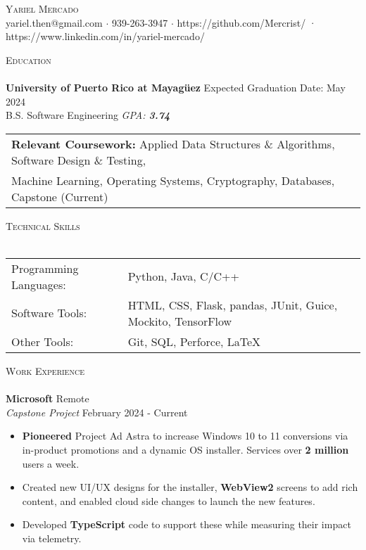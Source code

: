 \documentclass[a4paper]{article}
\newcommand{\lineunder} {
    \vspace*{-8pt} \\
    \hspace*{-18pt} \hrulefill \\
}
\newcommand{\header} [1] {
    {\hspace*{-18pt}\vspace*{6pt} \textsc{#1}}
    \vspace*{-6pt} \lineunder
}
\begin{document}
\vspace*{-40pt}

    

\vspace*{-10pt}
\begin{center}
	{\Huge \scshape {Yariel Mercado}}\\
	yariel.then@gmail.com $\cdot$ 939-263-3947 $\cdot$ https://github.com/Mercrist/ · https://www.linkedin.com/in/yariel-mercado/\\
\end{center}

\header{Education}
\textbf{University of Puerto Rico at Mayagüez} \hfill Expected Graduation Date: May 2024\\	
B.S. Software Engineering \textit{GPA: \bf{3.74}} 

\vspace{2mm}
\begin{tabular}{ l l }
	\textbf{Relevant Coursework:} Applied Data Structures \& Algorithms, Software Design \& Testing, \\Machine Learning, Operating Systems, Cryptography, Databases, Capstone (Current)
\vspace{2mm}
\end{tabular}

\header{Technical Skills}
\begin{tabular}{ l l }
	Programming Languages: & Python, Java, C/C++    \\
	Software Tools: & HTML, CSS, Flask, pandas, JUnit, Guice, Mockito, TensorFlow \\
	Other Tools:   & Git, SQL, Perforce, \LaTeX{} \\
	
\end{tabular}
\vspace{2mm}

\header{Work Experience}
\vspace{-1mm}
\textbf{Microsoft} \hfill Remote\\
\textit{Capstone Project} \hfill February 2024 - Current\\
\vspace{-3mm}
\begin{itemize} \itemsep -1pt
	\item \textbf{Pioneered} Project Ad Astra to increase Windows 10 to 11 conversions via in-product promotions and a dynamic OS installer. Services over \textbf{2 million} users a week. 
	\item Created new UI/UX designs for the installer,  \textbf{WebView2} screens to add rich content, and enabled cloud side changes to launch the new features.
	\item Developed \textbf{TypeScript} code to support these while measuring their impact via telemetry.
\end{itemize} 
\vspace{-2mm}
\end{document}
